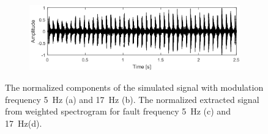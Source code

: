 \begin{figure}[!ht]
    \begin{subfigure}[b]{0.49\textwidth}
        \centering
        \captionsetup{skip=0.01pt}
        \caption{}
        \includegraphics[width=\textwidth]{wykresy/chapter_application/semi_blind/sygnal_simulated_17.png}
        \label{fig:chapter7/semi_blind/ext_comp17_sim}
    \end{subfigure}
    \vspace{\baselineskip}
    \caption{The normalized components of the simulated signal with modulation frequency 5~Hz (a) and 17~Hz (b). The normalized extracted signal from weighted spectrogram for fault frequency 5~Hz (c) and 17~Hz(d). }
    \label{fig:chapter7/semi_blind/comp_comparison_sim}
\end{figure}
%
